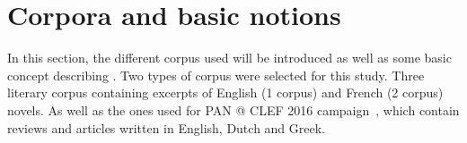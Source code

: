 \section{Corpora and basic notions \label{sec:corpora_and_basic_notions}}

In this section, the different corpus used will be introduced as well as some basic concept describing .
Two types of corpus were selected for this study.
Three literary corpus containing excerpts of English (1 corpus) and French (2 corpus) novels.
As well as the ones used for PAN @ CLEF 2016 campaign~\cite{pan16}, which contain reviews and articles written in English, Dutch and Greek.




